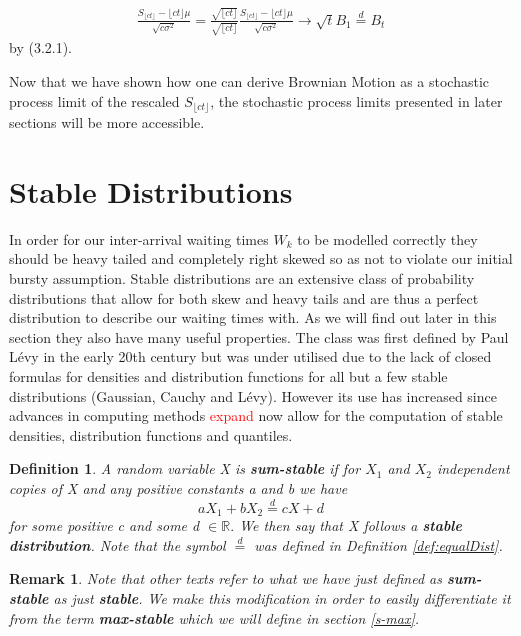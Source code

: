 \documentclass[honours,12pt]{UNSWthesis}
\newcommand{\R}{\mathbb{R}}
\newcommand{\1}{\mathbf 1}
\newtheorem{definition}[theorem]{Definition}
\newtheorem{remark}[theorem]{Remark}
\numberwithin{equation}{section}
\theoremstyle{definition}
\theoremstyle{remark}
\begin{document}

\begin{align*}
\frac{S_{\lfloor ct \rfloor} - \lfloor ct \rfloor\mu}{\sqrt{c \sigma^2}}
= \frac{\sqrt{\lfloor ct \rfloor}}{\sqrt{\lfloor ct \rfloor}}
\frac{S_{\lfloor ct \rfloor} - \lfloor ct \rfloor\mu}{\sqrt{c \sigma^2}}
\to \sqrt t B_1 \stackrel{d}{=} B_t
\end{align*}
by (3.2.1). 


Now that we have shown how one can derive Brownian Motion as a stochastic process limit of the rescaled $S_{\lfloor ct\rfloor}$, the stochastic process limits presented in later sections will be more accessible.
\section{Stable Distributions}
In order for our inter-arrival waiting times $W_k$ to be modelled correctly they should be heavy tailed and completely right skewed so as not to violate our initial bursty assumption.
Stable distributions are an extensive class of probability distributions that allow for both skew and heavy tails and are thus a perfect distribution to describe our waiting times with. As we will find out later in this section they also have many useful properties. The class was first defined by Paul L\'{e}vy in the early 20th century but was under utilised due to the lack of closed formulas for densities and distribution functions for all but a few stable distributions (Gaussian, Cauchy and L\'{e}vy). However its use has increased since advances in computing methods \textcolor{red}{expand} now allow for the computation of stable densities, distribution functions and quantiles.\\
\begin{definition}\cite{Nolan2015}
A random variable X is \textbf{sum-stable} if for $X_1$ and $X_2$ independent copies of X and any positive constants a and b we have
\[
	aX_1+bX_2\overset{d}{=}cX+d
\]
for some positive c and some d $\in\R.$ We then say that X follows a \textbf{stable distribution}. Note that the symbol $\overset{d}{=}$ was defined in Definition \ref{def:equalDist}.\\
\end{definition}
\begin{remark}
Note that other texts refer to what we have just defined as \textbf{sum-stable} as just \textbf{stable}. We make this modification in order to easily differentiate it from the term \textbf{max-stable} which we will define in section \ref{s-max}.\\
\end{remark}
\end{document}
